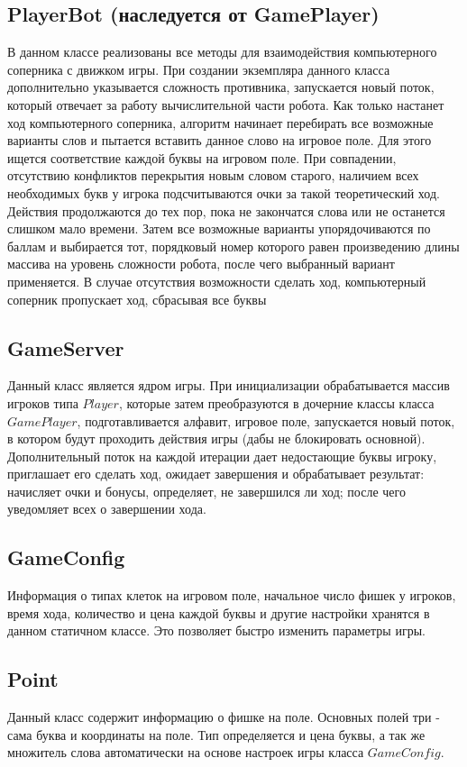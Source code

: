 \documentclass[a4paper,14pt]{article}
\begin{document}
	\subsection[PlayerBot]{PlayerBot (наследуется от GamePlayer)}
	В данном классе реализованы все методы для взаимодействия компьютерного соперника с движком игры. При создании экземпляра данного класса дополнительно указывается сложность противника, запускается новый поток, который отвечает за работу вычислительной части робота. Как только настанет ход компьютерного соперника, алгоритм начинает перебирать все возможные варианты слов и пытается вставить данное слово на игровое поле. Для этого ищется соответствие каждой буквы на игровом поле. При совпадении, отсутствию конфликтов перекрытия новым словом старого, наличием всех необходимых букв у игрока подсчитываются очки за такой теоретический ход. Действия продолжаются до тех пор, пока не закончатся слова или не останется слишком мало времени. Затем все возможные варианты упорядочиваются по баллам и выбирается тот, порядковый номер которого равен произведению длины массива на уровень сложности робота, после чего выбранный вариант применяется. В случае отсутствия возможности сделать ход, компьютерный соперник пропускает ход, сбрасывая все буквы
	
	\subsection{GameServer}
	Данный класс является ядром игры. При инициализации обрабатывается массив игроков типа $Player$, которые затем преобразуются в дочерние классы класса $GamePlayer$, подготавливается алфавит, игровое поле, запускается новый поток, в котором будут проходить действия игры (дабы не блокировать основной). Дополнительный поток на каждой итерации дает недостающие буквы игроку, приглашает его сделать ход, ожидает завершения и обрабатывает результат: начисляет очки и бонусы, определяет, не завершился ли ход; после чего уведомляет всех о завершении хода.
	
	\subsection{GameConfig}
	Информация о типах клеток на игровом поле, начальное число фишек у игроков, время хода, количество и цена каждой буквы и другие настройки хранятся в данном статичном классе. Это позволяет быстро изменить параметры игры.
	
	\subsection{Point}
	Данный класс содержит информацию о фишке на поле. Основных полей три - сама буква и координаты на поле. Тип определяется и цена буквы, а так же множитель слова автоматически на основе настроек игры класса $GameConfig$.
	
\end{document}
